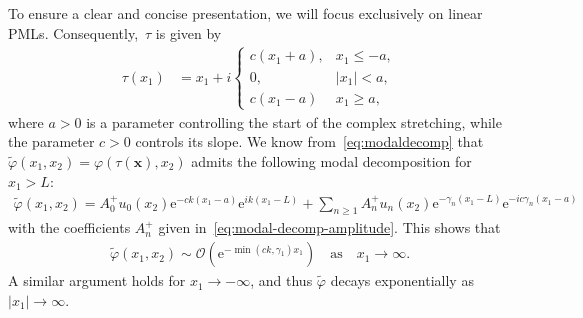 \documentclass[review,hidelinks,onefignum,onetabnum]{siamart220329}
\newcommand{\e}{\mathrm{e}}
\newcommand{\bx}{\mathbf{x}}
\newcommand{\tvarphi}{\widetilde \varphi}
\begin{document}
To ensure a clear and concise presentation, we will focus exclusively on linear PMLs. Consequently,~$\tau$ is given by
\begin{align}
    \label{eq:linear-pml}
  \tau(x_1) &= x_1 + i 
  \begin{cases}
    c (x_1+a), & x_1 \leq -a, \\
    0, & |x_1| < a, \\
    c (x_1 - a) & x_1 \geq a,
\end{cases}
\end{align}
where $a>0$ is a parameter controlling the start of the complex stretching, while the parameter $c>0$ controls its slope. We know from~\cref{eq:modaldecomp} that $\tvarphi(x_1,x_2) = \varphi(\tau(\bx),x_2)$ admits the following
modal decomposition for $x_1 > L$:
\begin{align}
  \label{eq:modal-decomp-extension}
  \tvarphi(x_1,x_2) =  \displaystyle A_0^+u_0(x_2)\e^{-ck(x_1-a)} \e^{ik(x_1-L)} + \sum_{n\geq 1}A_n^+u_n(x_2)\e^{-\gamma_n(x_1-L)}\e^{-ic\gamma_n(x_1-a)}
\end{align}
with the coefficients $A_n^+$ given in~\cref{eq:modal-decomp-amplitude}. This shows that 
\begin{align}
    \tvarphi(x_1,x_2) \sim \mathcal{O}(\e^{-\min(ck,\gamma_1) x_1}) \quad \mbox{as} \quad x_1 \to \infty.
    \label{eq:decay-rate}
\end{align}
A similar argument holds for $x_1 \to -\infty$, and thus $\tvarphi$ decays exponentially as $|x_1| \to \infty$. 
\end{document}
